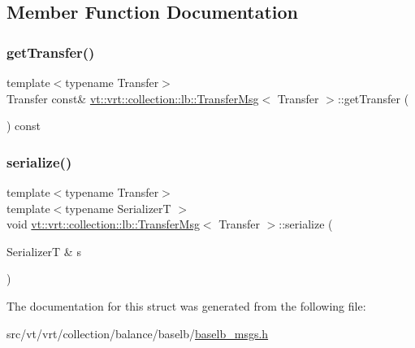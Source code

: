 \subsection{Member Function Documentation}
\mbox{\label{structvt_1_1vrt_1_1collection_1_1lb_1_1_transfer_msg_a9c93bf7d69be7e2bff65999cc4fadf98}} 
\subsubsection{\texorpdfstring{get\+Transfer()}{getTransfer()}}
{\footnotesize\ttfamily template$<$typename Transfer$>$ \\
Transfer const\& \hyperlink{structvt_1_1vrt_1_1collection_1_1lb_1_1_transfer_msg}{vt\+::vrt\+::collection\+::lb\+::\+Transfer\+Msg}$<$ Transfer $>$\+::get\+Transfer (\begin{DoxyParamCaption}{ }\end{DoxyParamCaption}) const\hspace{0.3cm}{\ttfamily [inline]}}

\mbox{\label{structvt_1_1vrt_1_1collection_1_1lb_1_1_transfer_msg_a230421d821c61d152b596b6c024010fd}} 
\subsubsection{\texorpdfstring{serialize()}{serialize()}}
{\footnotesize\ttfamily template$<$typename Transfer$>$ \\
template$<$typename SerializerT $>$ \\
void \hyperlink{structvt_1_1vrt_1_1collection_1_1lb_1_1_transfer_msg}{vt\+::vrt\+::collection\+::lb\+::\+Transfer\+Msg}$<$ Transfer $>$\+::serialize (\begin{DoxyParamCaption}\item[{SerializerT \&}]{s }\end{DoxyParamCaption})\hspace{0.3cm}{\ttfamily [inline]}}



The documentation for this struct was generated from the following file\+:\begin{DoxyCompactItemize}
\item 
src/vt/vrt/collection/balance/baselb/\hyperlink{baselb__msgs_8h}{baselb\+\_\+msgs.\+h}\end{DoxyCompactItemize}
